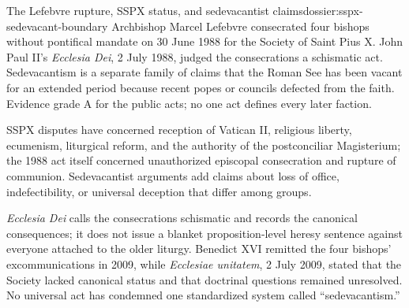 \begin{heresydossier}{The Lefebvre rupture, SSPX status, and sedevacantist claims}{dossier:sspx-sedevacant-boundary}
\objectfield Archbishop Marcel Lefebvre consecrated four bishops without pontifical mandate on 30 June 1988 for the Society of Saint Pius X. John Paul II's \emph{Ecclesia Dei}, 2 July 1988, judged the consecrations a schismatic act. Sedevacantism is a separate family of claims that the Roman See has been vacant for an extended period because recent popes or councils defected from the faith. Evidence grade A for the public acts; no one act defines every later faction.

\propositionfield SSPX disputes have concerned reception of Vatican II, religious liberty, ecumenism, liturgical reform, and the authority of the postconciliar Magisterium; the 1988 act itself concerned unauthorized episcopal consecration and rupture of communion. Sedevacantist arguments add claims about loss of office, indefectibility, or universal deception that differ among groups.

\responsefield \emph{Ecclesia Dei} calls the consecrations schismatic and records the canonical consequences; it does not issue a blanket proposition-level heresy sentence against everyone attached to the older liturgy. Benedict XVI remitted the four bishops' excommunications in 2009, while \emph{Ecclesiae unitatem}, 2 July 2009, stated that the Society lacked canonical status and that doctrinal questions remained unresolved. No universal act has condemned one standardized system called ``sedevacantism.''


\end{heresydossier}
